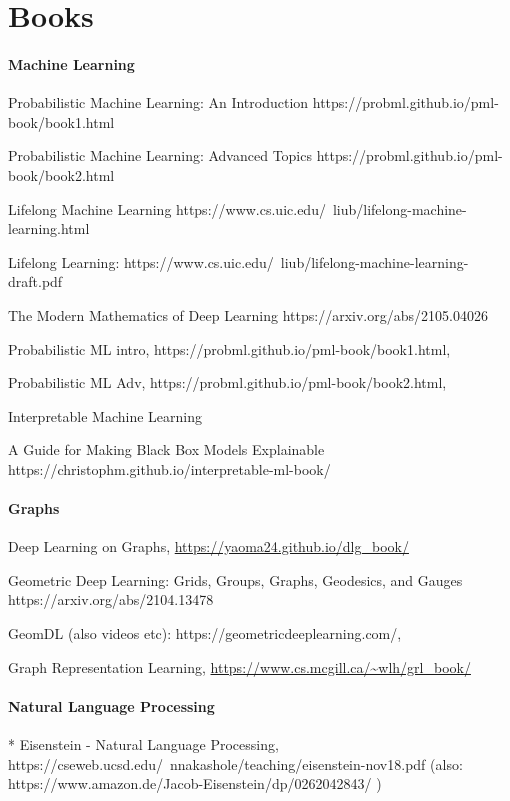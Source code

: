 \section{Books}

\paragraph{Machine Learning}

Probabilistic Machine Learning: An Introduction
https://probml.github.io/pml-book/book1.html

Probabilistic Machine Learning: Advanced Topics
https://probml.github.io/pml-book/book2.html

Lifelong Machine Learning
https://www.cs.uic.edu/~liub/lifelong-machine-learning.html

Lifelong Learning: https://www.cs.uic.edu/~liub/lifelong-machine-learning-draft.pdf

The Modern Mathematics of Deep Learning
https://arxiv.org/abs/2105.04026

Probabilistic ML intro, https://probml.github.io/pml-book/book1.html,

Probabilistic ML Adv, https://probml.github.io/pml-book/book2.html,

Interpretable Machine Learning

A Guide for Making Black Box Models Explainable
https://christophm.github.io/interpretable-ml-book/

\paragraph{Graphs}

Deep Learning on Graphs,
\url{https://yaoma24.github.io/dlg_book/}

Geometric Deep Learning: Grids, Groups, Graphs, Geodesics, and Gauges
https://arxiv.org/abs/2104.13478

GeomDL (also videos etc): 
https://geometricdeeplearning.com/,

Graph Representation Learning,
\url{https://www.cs.mcgill.ca/~wlh/grl_book/}

\paragraph{Natural Language Processing}

* Eisenstein - Natural Language Processing, https://cseweb.ucsd.edu/~nnakashole/teaching/eisenstein-nov18.pdf (also: https://www.amazon.de/Jacob-Eisenstein/dp/0262042843/ )

